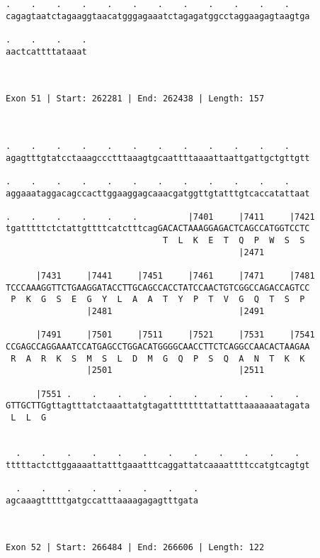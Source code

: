 \documentclass{article}
\begin{document}
\begin{Verbatim}
.    .    .    .    .    .    .    .    .    .    .    .    
cagagtaatctagaaggtaacatgggagaaatctagagatggcctaggaagagtaagtga
                                                            
.    .    .    .
aactcattttataaat
                
                
 
Exon 51 | Start: 262281 | End: 262438 | Length: 157



.    .    .    .    .    .    .    .    .    .    .    .    
agagtttgtatcctaaagccctttaaagtgcaattttaaaattaattgattgctgttgtt
                                                            
.    .    .    .    .    .    .    .    .    .    .    .    
aggaaataggacagccacttggaaggagcaaacgatggttgtatttgtcaccatattaat
                                                            
.    .    .    .    .    .          |7401     |7411     |7421
tgatttttctctattgttttcatctttcagGACACTAAAGGAGACTCAGCCATGGTCCTC
                               T  L  K  E  T  Q  P  W  S  S 
                                              |2471         
  
      |7431     |7441     |7451     |7461     |7471     |7481
TCCCAAAGGTTCTGAAGGATACCTTGCAGCCACCTATCCAACTGTCGGCCAGACCAGTCC
 P  K  G  S  E  G  Y  L  A  A  T  Y  P  T  V  G  Q  T  S  P 
                |2481                         |2491         
  
      |7491     |7501     |7511     |7521     |7531     |7541
CCGAGCCAGGAAATCCATGAGCCTGGACATGGGGCAACCTTCTCAGGCCAACACTAAGAA
 R  A  R  K  S  M  S  L  D  M  G  Q  P  S  Q  A  N  T  K  K 
                |2501                         |2511         
  
      |7551 .    .    .    .    .    .    .    .    .    .  
GTTGCTTGgttagtttatctaaattatgtagattttttttattatttaaaaaaatagata
 L  L  G                                                    
                                                            
  
  .    .    .    .    .    .    .    .    .    .    .    .  
tttttactcttggaaaattatttgaaatttcaggattatcaaaattttccatgtcagtgt
                                                            
  .    .    .    .    .    .    .    .
agcaaagtttttgatgccatttaaaagagagtttgata
                                      
                                      
 
Exon 52 | Start: 266484 | End: 266606 | Length: 122




\end{Verbatim}
\end{document}
